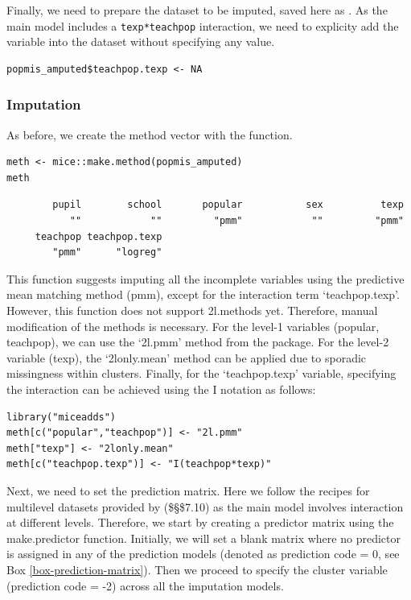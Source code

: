 \documentclass[
  article]{jss}
\begin{document}
Finally, we need to prepare the dataset to be imputed, saved here as
. As the main model includes a \texttt{texp*teachpop}
interaction, we need to explicity add the  variable
into the dataset without specifying any value.

\begin{verbatim}
popmis_amputed$teachpop.texp <- NA
\end{verbatim}

\subsubsection{Imputation}\label{imputation-2}

As before, we create the method vector with the 
function.

\begin{verbatim}
meth <- mice::make.method(popmis_amputed)
meth
\end{verbatim}

\begin{verbatim}
        pupil        school       popular           sex          texp 
           ""            ""         "pmm"            ""         "pmm" 
     teachpop teachpop.texp 
        "pmm"      "logreg" 
\end{verbatim}

This function suggests imputing all the incomplete variables using the
predictive mean matching method (pmm), except for the interaction term
`teachpop.texp'. However, this function does not support 2l.methods yet.
Therefore, manual modification of the methods is necessary. For the
level-1 variables (popular, teachpop), we can use the `2l.pmm' method
from the  package. For the level-2 variable (texp), the
`2lonly.mean' method can be applied due to sporadic missingness within
clusters. Finally, for the `teachpop.texp' variable, specifying the
interaction can be achieved using the I notation as follows:

\begin{verbatim}
library("miceadds")
meth[c("popular","teachpop")] <- "2l.pmm"
meth["texp"] <- "2lonly.mean"
meth[c("teachpop.texp")] <- "I(teachpop*texp)"
\end{verbatim}

Next, we need to set the prediction matrix. Here we follow the recipes
for multilevel datasets provided by \citep{buur18} (\$\S\$7.10) as the
main model involves interaction at different levels. Therefore, we start
by creating a predictor matrix using the make.predictor function.
Initially, we will set a blank matrix where no predictor is assigned in
any of the prediction models (denoted as prediction code = 0, see Box
\ref{box-prediction-matrix}). Then we proceed to specify the cluster
variable (prediction code = -2) across all the imputation models.
\end{document}
